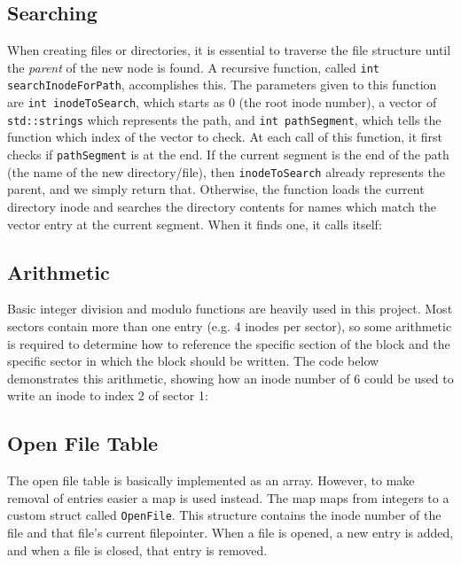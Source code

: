 \documentclass[]{article}
\begin{document}
\subsection{Searching}
When creating files or directories, it is essential to traverse the file structure until the \emph{parent} of the new node is found. A recursive function, called \texttt{int searchInodeForPath}, accomplishes this. The parameters given to this function are \texttt{int inodeToSearch}, which starts as 0 (the root inode number), a vector of \texttt{std::strings} which represents the path, and \texttt{int pathSegment}, which tells the function which index of the vector to check. At each call of this function, it first checks if \texttt{pathSegment} is at the end. If the current segment is the end of the path (the name of the new directory/file), then \texttt{inodeToSearch} already represents the parent, and we simply return that. Otherwise, the function loads the current directory inode and searches the directory contents for names which match the vector entry at the current segment. When it finds one, it calls itself:


\subsection{Arithmetic}
Basic integer division and modulo functions are heavily used in this project. Most sectors contain more than one entry (e.g. 4 inodes per sector), so some arithmetic is required to determine how to reference the specific section of the block and the specific sector in which the block should be written. The code below demonstrates this arithmetic, showing how an inode number of 6 could be used to write an inode to index 2 of sector 1:



\subsection{Open File Table}
The open file table is basically implemented as an array. However, to make removal of entries easier a map is used instead. The map maps from integers to a custom struct called \texttt{OpenFile}. This structure contains the inode number of the file and that file's current filepointer. When a file is opened, a new entry is added, and when a file is closed, that entry is removed.
\end{document}
